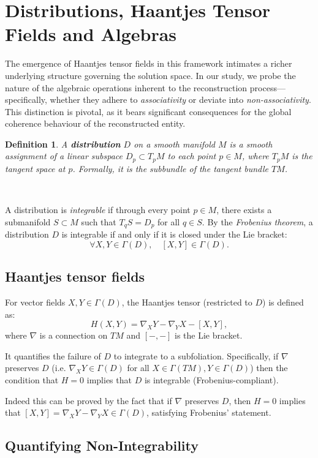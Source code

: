 \documentclass[runningheads]{llncs}
\newtheorem{dfn}{Definition}
\begin{document}
\section{Distributions, Haantjes Tensor Fields and Algebras}

The emergence of Haantjes tensor fields in this framework intimates a richer underlying structure governing the solution space. In our study, we probe the nature of the algebraic operations inherent to the reconstruction process---specifically, whether they adhere to {\it associativity} or deviate into {\it non-associativity}. This distinction is pivotal, as it bears significant consequences for the global coherence behaviour of the reconstructed entity.


\begin{dfn}
A {\bf distribution} $D$ on a smooth manifold $M$ is a smooth assignment of a linear subspace $D_p\subset T_pM$ to each point $p\in M$, where $T_pM$ is the tangent space at $p$. Formally, it is the subbundle of the tangent bundle $TM$.
\end{dfn}

~

A distribution is {\it integrable}  if through every point $p\in M$, there exists a submanifold $S\subset M$ such that $T_qS=D_p$ for all $q\in S$. 
By the {\it Frobenius theorem}, a distribution $D$ is integrable if and only if it is closed under the Lie bracket:
\[\forall X,Y\in \Gamma(D), \quad [X,Y]\in \Gamma(D).\]


\subsection{Haantjes tensor fields}

For vector fields \( X, Y \in \Gamma(D) \), the Haantjes tensor (restricted to $D$)  is defined as:
\[
H(X, Y) = \nabla_X Y - \nabla_Y X - [X, Y],
\]
where $\nabla$ is a connection on $TM$ and $[-,-]$ is the Lie bracket.

It quantifies the failure of \( D \) to integrate to a subfoliation. Specifically, if $\nabla$ preserves $D$ (i.e. $\nabla_XY\in\Gamma(D)$ for all $X\in\Gamma(TM), Y\in \Gamma(D)$) then the condition that $H=0$ implies that $D$ is integrable (Frobenius-compliant).

Indeed this can be proved by the fact that if $\nabla$ preserves $D$, then $H=0$ implies that $[X,Y]=\nabla_XY-\nabla_YX\in\Gamma(D)$, satisfying Frobenius' statement. 


\subsection{Quantifying Non-Integrability}
\end{document}
